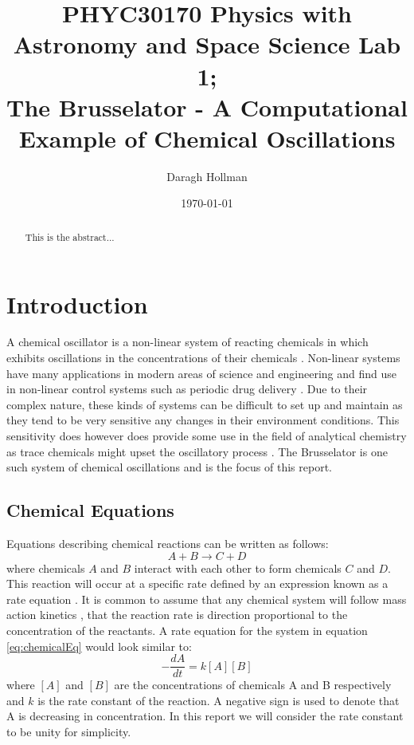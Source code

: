 \documentclass[reprint, amsmath, amssymb, aps]{revtex4-2}
\begin{document}
	
\title{PHYC30170 Physics with Astronomy and Space Science Lab 1;\\The Brusselator - A Computational Example of Chemical Oscillations}

\author{Daragh Hollman}
\date{\today}

\begin{abstract}
This is the abstract...
\end{abstract}

\maketitle

\section{Introduction}
A chemical oscillator is a non-linear system of reacting chemicals in which exhibits oscillations in the concentrations of their chemicals \cite{nicolis}. Non-linear systems have many applications in modern areas of science and engineering \cite{parada} and find use in non-linear control systems such as periodic drug delivery \citep{oscillationsAdvances}. Due to their complex nature, these kinds of systems can be difficult to set up and maintain as they tend to be very sensitive any changes in their environment conditions. This sensitivity does however does provide some use in the field of analytical chemistry as trace chemicals might upset the oscillatory process \cite{analytical}. The Brusselator is one such system of chemical oscillations and is the focus of this report.

\subsection{Chemical Equations}
Equations describing chemical reactions can be written as follows:
\begin{equation}
	A + B \rightarrow C + D
	\label{eq:chemicalEq}
\end{equation}where chemicals $A$ and $B$ interact with each other to form chemicals $C$ and $D$. This reaction will occur at a specific rate defined by an expression known as a rate equation \cite{dynamics}. It is common to assume that any chemical system will follow mass action kinetics \citep{dynamics}\cite{massAction}, that the reaction rate is direction proportional to the concentration of the reactants. A rate equation for the system in equation \ref{eq:chemicalEq} would look similar to:
\begin{equation}
	-\frac{dA}{dt} = k[A][B]
\end{equation}where $[A]$ and $[B]$ are the concentrations of chemicals A and B respectively and $k$ is the rate constant of the reaction. A negative sign is used to denote that A is decreasing in concentration. In this report we will consider the rate constant to be unity for simplicity.
\end{document}
